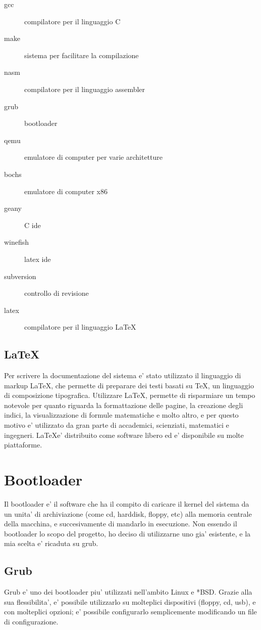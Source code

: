 \documentclass[a4paper,10pt]{book}
\begin{document}
\begin{description}
\item[gcc] compilatore per il linguaggio C
\item[make] sistema per facilitare la compilazione
\item[nasm] compilatore per il linguaggio assembler
\item[grub] bootloader
\item[qemu] emulatore di computer per varie architetture
\item[bochs] emulatore di computer x86
\item[geany] C ide
\item[winefish] latex ide 
\item[subversion] controllo di revisione
\item[latex] compilatore per il linguaggio \LaTeX
\end{description}



\section{\LaTeX}
Per scrivere la documentazione del sistema e' stato utilizzato il linguaggio di markup
\LaTeX, che permette di preparare dei testi basati su \TeX, un linguaggio di composizione 
tipografica. Utilizzare \LaTeX, permette di risparmiare un tempo notevole per quanto riguarda
la formattazione delle pagine, la creazione degli indici, la visualizzazione di formule matematiche
e molto altro, e per questo motivo e' utilizzato da gran parte di accademici, scienziati, matematici
e ingegneri. \LaTeX e' distribuito come software libero ed e' disponibile su molte piattaforme.





\chapter{Bootloader}
Il bootloader e' il software che ha il compito di caricare il kernel del sistema da un unita' di archiviazione
(come cd, harddisk, floppy, etc) alla memoria centrale della macchina, e succesivamente
di mandarlo in esecuzione.
Non essendo il bootloader lo scopo del progetto, ho deciso di utilizzarne uno gia' esistente, e la mia
scelta e' ricaduta su grub. 

\section{Grub}
Grub e' uno dei bootloader piu' utilizzati nell'ambito Linux e *BSD.
Grazie alla sua flessibilita', e' possibile utilizzarlo su molteplici dispositivi (floppy, cd, usb), 
e con molteplici opzioni; e' possibile configurarlo semplicemente modificando un file di configurazione.
\end{document}
